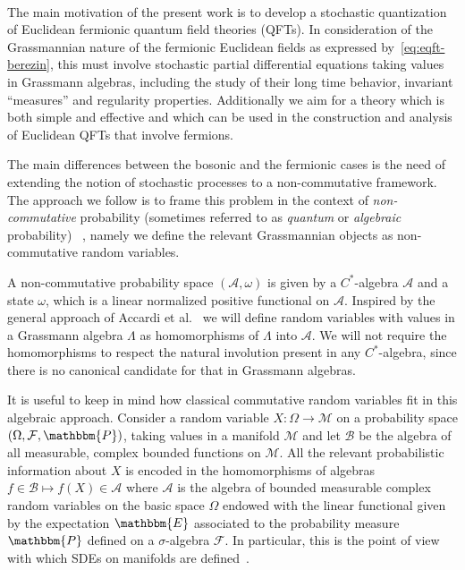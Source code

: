 \documentclass[11pt]{article}
\newcommand{\tmtextit}[1]{{\itshape{#1}}}
\begin{document}
\

The main motivation of the present work is to develop a stochastic
quantization of Euclidean fermionic quantum field theories (QFTs). In
consideration of the Grassmannian nature of the fermionic Euclidean fields as
expressed by~{\eqref{eq:eqft-berezin}}, this must involve stochastic partial
differential equations taking values in Grassmann algebras, including the
study of their long time behavior, invariant ``measures'' and regularity
properties. Additionally we aim for a theory which is both simple and
effective and which can be used in the construction and analysis of Euclidean
QFTs that involve fermions.

The main differences between the bosonic and the fermionic cases is the need
of extending the notion of stochastic processes to a non-commutative
framework. The approach we follow is to frame this problem in the context of
\tmtextit{non-commutative} probability (sometimes referred to as
\tmtextit{quantum} or \tmtextit{algebraic} probability)~
{\cite{parthasarathy_introduction_1992,biane_calcul_1995,Meyerbook,streater_classical_2000,accardi_outline_2015}},
namely we define the relevant Grassmannian objects as non-commutative random
variables.

A non-commutative probability space $(\mathcal{A}, \omega)$ is given by a
$C^{\ast}$-algebra $\mathcal{A}$ and a state $\omega$, which is a linear
normalized positive functional on $\mathcal{A}$. Inspired by the general
approach of Accardi et al.~{\cite{accardi_quantum_1982}} we will define random
variables with values in a Grassmann algebra $\Lambda$ as homomorphisms of
$\Lambda$ into $\mathcal{A}$. We will not require the homomorphisms to respect
the natural involution present in any $C^{\ast}$-algebra, since there is no
canonical candidate for that in Grassmann algebras.

It is useful to keep in mind how classical commutative random variables fit
in this algebraic approach. Consider a random variable $X : \Omega \rightarrow
\mathcal{M}$ on a probability space $(\Omega, \mathcal{F}, \mathbbm{P})$,
taking values in a manifold $\mathcal{M}$ and let $\mathcal{B}$ be the algebra
of all measurable, complex bounded functions on $\mathcal{M}$. All the
relevant probabilistic information about $X$ is encoded in the homomorphisms
of algebras $f \in \mathcal{B} \mapsto f (X) \in \mathcal{A}$ where
$\mathcal{A}$ is the algebra of bounded measurable complex random variables on
the basic space $\Omega$ endowed with the linear functional given by the
expectation $\mathbbm{E}$ associated to the probability measure $\mathbbm{P}$
defined on a $\sigma$-algebra $\mathcal{F}$. In particular, this is the point
of view with which SDEs on manifolds are defined~{\cite{hsu_stochastic_2002}}.
\end{document}

